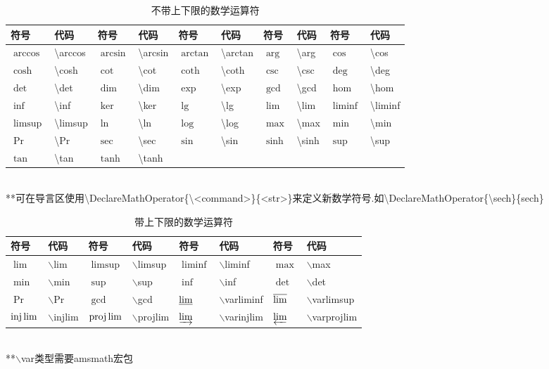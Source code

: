 \documentclass[UTF8,fontset=ubuntu]{ctexbook}
\begin{document}
\begin{table}[H]
\begin{tabular}{l l l l l l l l l l}
    \hline
    符号 & 代码 & 符号 & 代码 & 符号 & 代码 & 符号 & 代码 & 符号 & 代码\\
    \hline
    $\arccos$ & \textbackslash arccos & $\arcsin$ & \textbackslash arcsin & $\arctan$ & \textbackslash arctan & $\arg$ & \textbackslash arg & $\cos$ & \textbackslash cos\\
    $\cosh$ & \textbackslash cosh & $\cot$ & \textbackslash cot & $\coth$ & \textbackslash coth & $\csc$ & \textbackslash csc & $\deg$ & \textbackslash deg\\
    $\det$ & \textbackslash det & $\dim$ & \textbackslash dim & $\exp$ & \textbackslash exp & $\gcd$ & \textbackslash gcd & $\hom$ & \textbackslash hom\\
    $\inf$ & \textbackslash inf & $\ker$ & \textbackslash ker & $\lg$ & \textbackslash lg & $\lim$ & \textbackslash lim & $\liminf$ & \textbackslash liminf\\
    $\limsup$ & \textbackslash limsup & $\ln$ & \textbackslash ln & $\log$ & \textbackslash log & $\max$ & \textbackslash max & $\min$ & \textbackslash min\\
    $\Pr$ & \textbackslash Pr & $\sec$ & \textbackslash sec & $\sin$ & \textbackslash sin & $\sinh$ & \textbackslash sinh & $\sup$ & \textbackslash sup\\
    $\tan$ & \textbackslash tan & $\tanh$ & \textbackslash tanh\\
    \hline
\end{tabular}\\[2mm]
**可在导言区使用\textbackslash DeclareMathOperator\{\textbackslash \textless command\textgreater\}\{\textless str\textgreater\}来定义新数学符号.如\textbackslash DeclareMathOperator\{\textbackslash sech\}\{sech\}
\caption{不带上下限的数学运算符}
\end{table}

\begin{table}[H]
\begin{tabular}{l l l l l l l l}
	\hline
	符号 & 代码 & 符号 & 代码 & 符号 & 代码 & 符号 & 代码\\
	\hline
	$\lim$ & $\backslash$lim & $\limsup$ & $\backslash$limsup & $\liminf$ & $\backslash$liminf & $\max$ & $\backslash$max\\
	$\min$ & $\backslash$min & $\sup$ & $\backslash$sup & $\inf$ & $\backslash$inf & $\det$ & $\backslash$det\\
	$\Pr$ & $\backslash$Pr & $\gcd$ & $\backslash$gcd & $\varliminf$ & $\backslash$varliminf & $\varlimsup$ & $\backslash$varlimsup\\
	$\injlim$ & $\backslash$injlim & $\projlim$ & $\backslash$projlim & $\varinjlim$ & $\backslash$varinjlim & $\varprojlim$ & $\backslash$varprojlim\\
	\hline
\end{tabular}\\[2mm]
**$\backslash$var类型需要amsmath宏包
\caption{带上下限的数学运算符}
\end{table}
\end{document}
